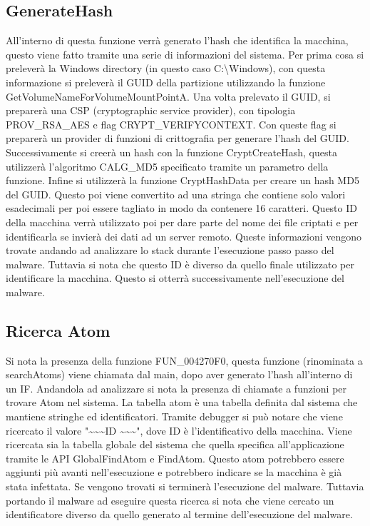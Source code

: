 \documentclass[a4paper,12pt]{article}
\begin{document}
\subsection{GenerateHash}
All'interno di questa funzione verrà generato l'hash che identifica la macchina, questo viene fatto tramite una serie di informazioni del sistema. Per prima cosa si preleverà la Windows directory (in questo caso C:\textbackslash Windows), con questa informazione si preleverà il GUID della partizione utilizzando la funzione GetVolumeNameForVolumeMountPointA. Una volta prelevato il GUID, si preparerà una CSP (cryptographic service provider), con tipologia PROV\_RSA\_AES e flag CRYPT\_VERIFYCONTEXT. Con queste flag si preparerà un provider di funzioni di crittografia per generare l'hash del GUID. Successivamente si creerà un hash con la funzione CryptCreateHash, questa utilizzerà l'algoritmo CALG\_MD5 specificato tramite un parametro della funzione. Infine si utilizzerà la funzione CryptHashData per creare un hash MD5 del GUID. Questo poi viene convertito ad una stringa che contiene solo valori esadecimali per poi essere tagliato in modo da contenere 16 caratteri. Questo ID della macchina verrà utilizzato poi per dare parte del nome dei file criptati e per identificarla se invierà dei dati ad un server remoto. Queste informazioni vengono trovate andando ad analizzare lo stack durante l'esecuzione passo passo del malware. Tuttavia si nota che questo ID è diverso da quello finale utilizzato per identificare la macchina. Questo si otterrà successivamente nell'esecuzione del malware.

\subsection{Ricerca Atom}
Si nota la presenza della funzione FUN\_004270F0, questa funzione (rinominata a searchAtoms) viene chiamata dal main, dopo aver generato l'hash all'interno di un IF. Andandola ad analizzare si nota la presenza di chiamate a funzioni per trovare Atom nel sistema. La tabella atom è una tabella definita dal sistema che mantiene stringhe ed identificatori. Tramite debugger si può notare che viene ricercato il valore "\textasciitilde\textasciitilde\textasciitilde ID \textasciitilde\textasciitilde\textasciitilde", dove ID è l'identificativo della macchina. Viene ricercata sia la tabella globale del sistema che quella specifica all'applicazione tramite le API GlobalFindAtom e FindAtom. 
Questo atom potrebbero essere aggiunti più avanti nell'esecuzione e potrebbero indicare se la macchina è già stata infettata. Se vengono trovati si terminerà l'esecuzione del malware. Tuttavia portando il malware ad eseguire questa ricerca si nota che viene cercato un identificatore diverso da quello generato al termine dell'esecuzione del malware.
\end{document}
